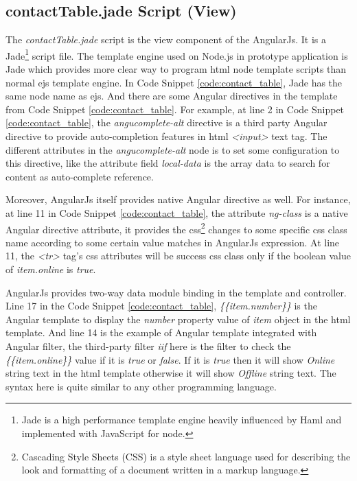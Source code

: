 \subsection{contactTable.jade Script (View)}

\par The \textit{contactTable.jade} script is the view component of the AngularJs. It is a Jade\footnote{Jade is a high performance template engine heavily influenced by Haml and implemented with JavaScript for node.\cite{github:jade}} script file. The template engine used on Node.js in prototype application is Jade which provides more clear way to program \gls{html} node template scripts than normal \gls{ejs} template engine. In Code Snippet \ref{code:contact_table}, Jade has the same node name as \gls{ejs}. And there are some Angular directives in the template from Code Snippet \ref{code:contact_table}. For example, at line 2 in Code Snippet \ref{code:contact_table}, the \textit{angucomplete-alt} directive is a third party Angular directive to provide auto-completion features in \gls{html} \textit{<input>} text tag. The different attributes in the \textit{angucomplete-alt} node is to set some configuration to this directive, like the attribute field \textit{local-data} is the array data to search for content as auto-complete reference.

\par Moreover, AngularJs itself provides native Angular directive as well. For instance, at line 11 in Code Snippet \ref{code:contact_table}, the attribute \textit{ng-class} is a native Angular directive attribute, it provides the \gls{css}\footnote{Cascading Style Sheets (CSS) is a style sheet language used for describing the look and formatting of a document written in a markup language.\cite{wiki:css}} changes to some specific \gls{css} class name according to some certain value matches in AngularJs expression. At line 11, the \textit{<tr>} tag's \gls{css} attributes will be success \gls{css} class only if the boolean value of \textit{item.online} is \textit{true}.

\par AngularJs provides two-way data module binding in the template and controller. Line 17 in the Code Snippet \ref{code:contact_table}, \textit{\{\{item.number\}\}} is the Angular template to display the \textit{number} property value of \textit{item} object in the \gls{html} template. And line 14 is the example of Angular template integrated with Angular filter, the third-party filter \textit{iif} here is the filter to check the \textit{\{\{item.online\}\}} value if it is \textit{true} or \textit{false}. If it is \textit{true} then it will show \textit{Online} string text in the \gls{html} template otherwise it will show \textit{Offline} string text. The syntax here is quite similar to any other programming language.

